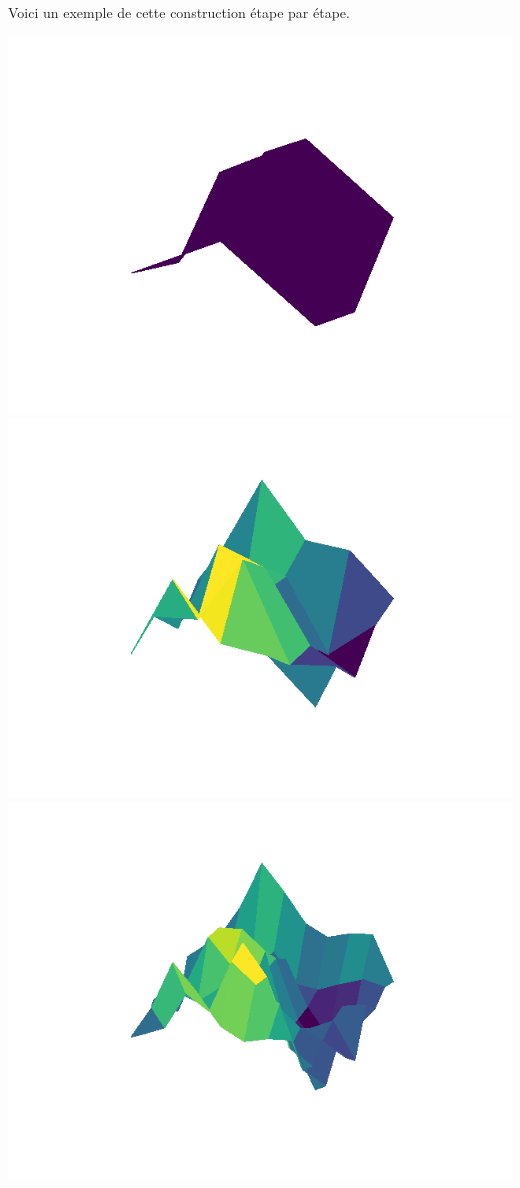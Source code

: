 \documentclass[11pt,class=report,crop=false]{standalone}
\begin{document}
\begin{exemple}
Voici un exemple de cette construction étape par étape.


\begin{center}
\includegraphics[scale=\myscale,scale=0.3]{figures/diamant-carre-01-1}
\includegraphics[scale=\myscale,scale=0.3]{figures/diamant-carre-01-2}
\includegraphics[scale=\myscale,scale=0.3]{figures/diamant-carre-01-3}


\end{center}
\end{exemple}
\end{document}
